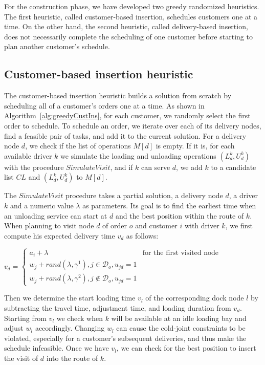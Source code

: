 \documentclass{article}
\begin{document}
For the construction phase, we have developed two greedy randomized heuristics. The first heuristic, called customer-based insertion, schedules customers one at a time. On the other hand, the second heuristic, called delivery-based insertion, does not necessarily complete the scheduling of one customer before starting to plan another customer's schedule.

\subsection{Customer-based insertion heuristic}

The customer-based insertion heuristic builds a solution from scratch by scheduling all of a customer's orders one at a time. As shown in Algorithm~\ref{alg:greedyCustIns}, for each customer, we randomly select the first order to schedule. To schedule an order, we iterate over each of its delivery nodes, find a feasible pair of tasks, and add it to the current solution. For a delivery node $d$, we check if the list of operations $M[d]$ is empty. If it is, for each available driver $k$ we simulate the loading and unloading operations $(L^k_d,U^k_d)$ with the procedure $SimulateVisit$, and if $k$ can serve $d$, we add $k$ to a candidate list $CL$ and $(L^k_d,U^k_d)$ to $M[d]$.

The $SimulateVisit$ procedure takes a partial solution, a delivery node $d$, a driver $k$ and a numeric value $\lambda$ as parameters. Its goal is to find the earliest time when an unloading service can start at $d$ and the best position within the route of $k$. When planning to visit node $d$ of order $o$ and customer $i$ with driver $k$, we first compute his expected delivery time $v_d$ as follows:

$ v_d = \left\{
    \begin{array}{rl}
        a_i + \lambda                                                   & \text{for the first visited node} \\
        w_j + rand(\lambda, \gamma^1), j \in \mathcal{D}_o,  u_{jd}=1   &                                   \\
        w_j + rand(\lambda, \gamma^2), j \notin \mathcal{D}_o, u_{jd}=1 &
    \end{array}
    \right.$

Then we determine the start loading time $v_l$ of the corresponding dock node $l$ by subtracting the travel time, adjustment time, and loading duration from $v_d$. Starting from $v_l$ we check when $k$ will be available at an idle loading bay and adjust $w_l$ accordingly. Changing $w_l$ can cause the cold-joint constraints to be violated, especially for a customer's subsequent deliveries, and thus make the schedule infeasible. Once we have $v_l$, we can check for the best position to insert the visit of $d$ into the route of $k$.
\end{document}

